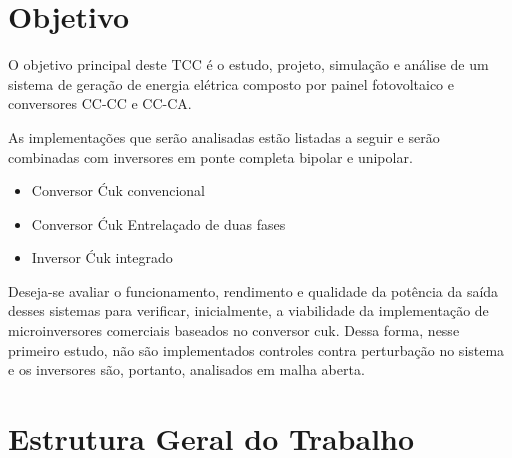 \documentclass[
	12pt,				%
	openany,
	onseside,
	a4paper,			%
	english,			%
	french,				%
	spanish,			%
	brazil,				%
	]{abntex2}
\begin{document}
%
%
%

\section{Objetivo}

O objetivo principal deste TCC é o estudo, projeto, simulação e análise de um sistema de geração de energia elétrica composto por painel fotovoltaico e conversores CC-CC e CC-CA. 

As implementações que serão analisadas estão listadas a seguir e serão combinadas com inversores em ponte completa bipolar e unipolar.

\begin{itemize}%
	\item Conversor Ćuk convencional
	\item Conversor Ćuk Entrelaçado de duas fases
	\item Inversor Ćuk integrado
\end{itemize}

Deseja-se avaliar o funcionamento, rendimento e qualidade da potência da saída desses sistemas para verificar, inicialmente, a viabilidade da implementação de microinversores comerciais baseados no conversor cuk. Dessa forma, nesse primeiro estudo, não são implementados controles contra perturbação no sistema e os inversores são, portanto, analisados em malha aberta.

\section{Estrutura Geral do Trabalho}
\end{document}
